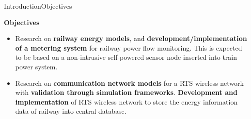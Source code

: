 	

		
		
		
		
	





\begin{frame}{Introduction}{Objectives}
\begin{block}{\textbf{Objectives}}
\begin{itemize}
	\setlength\itemsep{0em}
	
	\item	Research on \textbf{railway energy models}, and \textbf{development/implementation of a metering system} for railway power flow monitoring.
	This is expected to be based on a non-intrusive self-powered sensor node inserted into train power system.
	
	\item Research on \textbf{communication network models} for a \ac{RTS} wireless network with \textbf{validation through simulation frameworks}.
	\textbf{Development and implementation} of \ac{RTS} wireless network to store the energy information data of railway into central database.
	
	
\end{itemize}
\end{block}
\end{frame}
